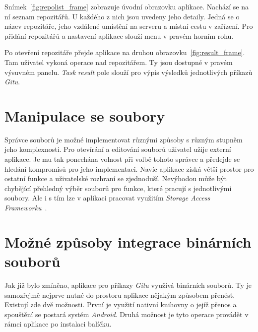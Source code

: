 Snímek~\ref{fig:repolist_frame} zobrazuje úvodní obrazovku aplikace. Nachází se na ní seznam repozitářů. U každého z nich jsou uvedeny jeho detaily. Jedná se o název repozitáře, jeho vzdálené umístění na serveru a místní cestu v zařízení. Pro přidání repozitářů a nastavení aplikace slouží menu v pravém horním rohu. 

Po otevření repozitáře přejde aplikace na druhou obrazovku~\ref{fig:result_frame}. Tam uživatel vykoná operace nad repozitářem. Ty jsou dostupné v pravém výsuvném panelu. \emph{Task result} pole slouží pro výpis výsledků jednotlivých příkazů \emph{Gitu}.

\section{Manipulace se soubory}
Správce souborů je možné implementovat různými způsoby s různým stupněm jeho komplexnosti. Pro otevírání a editování souborů uživatel užije externí aplikace. Je mu tak ponechána volnost při volbě tohoto správce a předejde se hledání kompromisů pro jeho implementaci. Navíc aplikace získá větší prostor pro ostatní funkce a uživatelské rozhraní se zjednoduší. Nevýhodou může být chybějící přehledný výběr souborů pro funkce, které pracují s jednotlivými soubory. Ale i s tím lze v aplikaci pracovat využitím \emph{Storage Access Frameworku}~.

\section{Možné způsoby integrace binárních souborů}
Jak již bylo zmíněno, aplikace pro příkazy \emph{Gitu} využívá binárních souborů. Ty je samozřejmě nejprve nutné do prostoru aplikace nějakým způsobem přenést. Existují zde dvě možnosti. První je využití nativní knihovny o jejíž přenos a spouštění se postará systém \emph{Android}. Druhá možnost je tyto operace provádět v rámci aplikace po instalaci balíčku.

